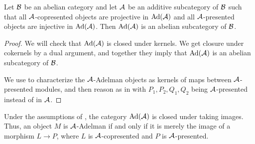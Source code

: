 \begin{proposition}\label{prp:ad-ab}
  Let $\mathcal{B}$ be an abelian category and let $\mathcal{A}$ be an additive subcategory of $\mathcal{B}$ such that
  all $\mathcal{A}$-copresented objects are projective in $\textup{Ad}(\mathcal{A})$ and
  all $\mathcal{A}$-presented objects are injective in $\textup{Ad}(\mathcal{A})$.
  Then $\textup{Ad}(\mathcal{A})$ is an abelian subcategory of $\mathcal{B}$. %
\end{proposition}



\begin{proof}
  We will check that $\textup{Ad}(\mathcal{A})$ is closed under kernels. We get closure under cokernels by a dual argument, and together they imply that $\textup{Ad}(\mathcal{A})$ is an abelian subcategory of $\mathcal{B}$.
  
  We use  to characterize the $\mathcal{A}$-Adelman objects as kernels of maps between $\mathcal{A}$-presented modules, and then reason as in  with $P_1,P_2,Q_1,Q_2$ being $\mathcal{A}$-presented instead of in $\mathcal{A}$.
\end{proof}

\begin{remark}\label{rem:adelman-as-image}
  Under the assumptions of , the category $\textup{Ad}(\mathcal{A})$ is closed under taking images.
  Thus, an object $M$ is $\mathcal{A}$-Adelman if and only if it is merely the image of a morphism $L \to P$, where $L$ is $\mathcal{A}$-copresented and $P$ is $\mathcal{A}$-presented.
\end{remark}

